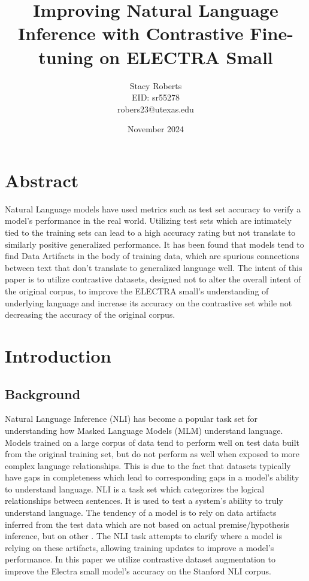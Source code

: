 \documentclass[11pt]{article}
\title{Improving Natural Language Inference with Contrastive Fine-tuning on ELECTRA Small}
\author{Stacy Roberts \\ EID: sr55278 \\robers23@utexas.edu}
\date{November 2024}
\begin{document}
\maketitle


\section*{Abstract}
Natural Language models have used metrics such as test set accuracy to verify a model's performance in the real world. Utilizing test sets which are intimately tied to the training sets can lead to a high accuracy rating but not translate to similarly positive generalized performance. It has been found that models tend to find Data Artifacts in the body of training data, which are spurious connections between text that don't translate to generalized language well. The intent of this paper is to utilize contrastive datasets, designed not to alter the overall intent of the original corpus, to improve the ELECTRA small's understanding of underlying language and increase its accuracy on the contrastive set while not decreasing the accuracy of the original corpus.

\section{Introduction}
\subsection{Background}
Natural Language Inference (NLI) has become a popular task set for understanding how Masked Language Models (MLM) understand language. Models trained on a large corpus of data tend to perform well on test data built from the original training set, but do not perform as well when exposed to more complex language relationships. This is due to the fact that datasets typically have gaps in completeness which lead to corresponding gaps in a model's ability to understand language. NLI is a task set which categorizes the logical relationships between sentences.  It is used to test a system's ability to truly understand language. The tendency of a model is to rely on data artifacts inferred from the test data which are not based on actual premise/hypothesis inference, but on other . The NLI task attempts to clarify where a model is relying on these artifacts, allowing training updates to improve a model's performance. In this paper we utilize contrastive dataset augmentation to improve the Electra small model's accuracy on the Stanford NLI corpus.
\end{document}
